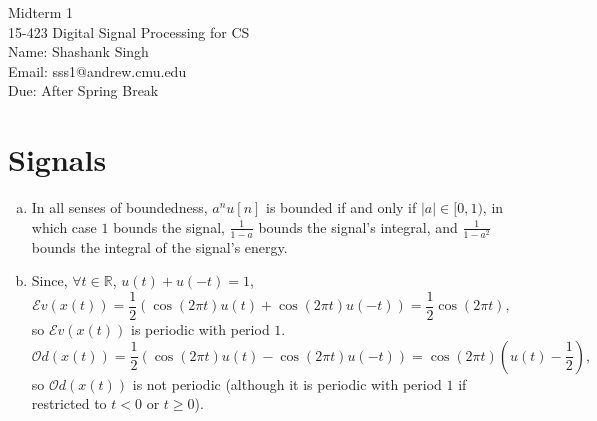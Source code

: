 \documentclass[11pt]{article}
\makeatletter
\newcommand{\myname}{Shashank Singh}
\newcommand{\myandrew}{sss1@andrew.cmu.edu}
\newcommand{\myclass}{15-423 Digital Signal Processing for CS}
\newcommand{\myhwnum}{1}
\newcommand{\duedate}{After Spring Break}
\newcommand{\R}{\mathbb{R}} %
\newcommand{\E}{\mathcal{E}v} %
\renewcommand{\O}{\mathcal{O}d} %
\makeatother
\begin{document}
\thispagestyle{plain}

{\Large Midterm \myhwnum} \\
\myclass \\
Name: \myname \\
Email: \myandrew \\
Due: \duedate

\section{Signals}
\begin{enumerate}[a.]
\item In all senses of boundedness, $a^nu[n]$ is bounded if and only if
$|a| \in [0,1)$, in which case $1$ bounds the signal, $\frac{1}{1 - a}$ bounds
the signal's integral, and $\frac{1}{1 - a^2}$ bounds the integral of the
signal's energy.

\item Since, $\forall t \in \R$, $u(t) + u(-t) = 1$,
\[\E(x(t))
 = \frac12(\cos(2\pi t)u(t) + \cos(2\pi t)u(-t))
 = \frac12 \cos(2\pi t),\]
so $\E(x(t))$ is periodic with period $1$.
\[\O(x(t))
 = \frac12(\cos(2\pi t)u(t) - \cos(2\pi t)u(-t))
 = \cos(2\pi t)\left( u(t) - \frac12\right),\]
so $\O(x(t))$ is not periodic (although it is periodic with period $1$ if
restricted to $t < 0$ or $t \geq 0$).
\end{enumerate}

\end{document}
